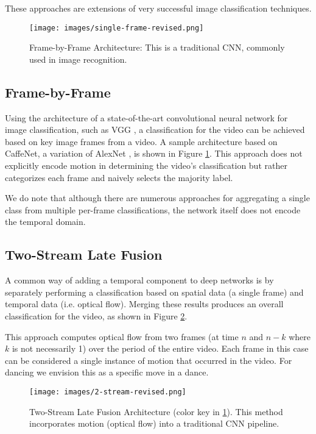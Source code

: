\documentclass[10pt,twocolumn,letterpaper]{article}
\begin{document}
These approaches are extensions of very successful image classification techniques. 

\begin{figure}[b]
\centering
\texttt{[image: images/single-frame-revised.png]}
\caption{Frame-by-Frame Architecture: This is a traditional CNN, commonly used in image recognition.}
\label{fig:arch1}
\end{figure}

\subsection{Frame-by-Frame} Using the architecture of a state-of-the-art convolutional neural network for image classification, such as VGG \cite{simonyan2014very}, a classification for the video can be achieved based on key image frames from a video.  A sample architecture based on CaffeNet, a variation of AlexNet \cite{NIPS2012_4824}, is shown in Figure \ref{fig:arch1}. This approach does not explicitly encode motion in determining the video's classification but rather categorizes each frame and naively selects the majority label.

We do note that although there are numerous approaches for aggregating a single class from multiple per-frame classifications, the network itself does not encode the temporal domain.

\subsection{Two-Stream Late Fusion} A common way of adding a temporal component to deep networks is by separately performing a classification based on spatial data (a single frame) and temporal data (i.e. optical flow). Merging these results produces an overall classification for the video, as shown in Figure \ref{fig:arch2}.

This approach computes optical flow from two frames (at time $n$ and $n-k$ where $k$ is not necessarily 1) over the period of the entire video. Each frame in this case can be considered a single instance of motion that occurred in the video. For dancing we envision this as a specific move in a dance.

\begin{figure}[htp!]
\centering
\texttt{[image: images/2-stream-revised.png]}
\caption{Two-Stream Late Fusion Architecture (color key in \ref{fig:arch1}). This method incorporates motion (optical flow) into a traditional CNN pipeline.}
\label{fig:arch2}
\end{figure}
\end{document}
